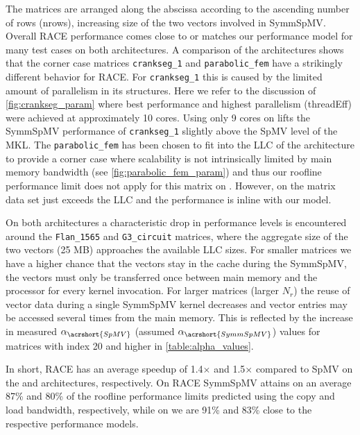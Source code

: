 The matrices are arranged along the abscissa according to the ascending number of rows (\acrshort{nrows}), \ie increasing size of the two vectors involved in \acrshort{SymmSpMV}. Overall \acrshort{RACE}  performance comes close to or matches our performance model for many test cases on both architectures. 
A comparison of the architectures shows that the corner case matrices \texttt{crankseg\_1} and \texttt{parabolic\_fem} have a strikingly different behavior for \acrshort{RACE}. For \texttt{crankseg\_1} this is caused by the limited amount of parallelism in its structures. Here we refer to the discussion of \cref{fig:crankseg_param} where best performance and highest parallelism (\acrshort{threadEff}) were achieved at approximately 10 cores. Using only 9 cores on \SKX lifts the \acrshort{SymmSpMV} performance of  \texttt{crankseg\_1} slightly above the \acrshort{SpMV} level of the MKL. The \texttt{parabolic\_fem} has been chosen to fit into the \acrshort{LLC} of the \SKX architecture to provide a corner case where scalability is not intrinsically limited by main memory bandwidth (see  \cref{fig:parabolic_fem_param}) and thus our roofline performance limit does not apply for this matrix on \SKX. However, on \IVB the matrix data set just exceeds the LLC and the performance is inline with our model. 

On both architectures a characteristic drop in performance levels is encountered around the \texttt{Flan\_1565} and \texttt{G3\_circuit} matrices, where the aggregate size of the two vectors (25 MB) approaches the available LLC sizes. For smaller matrices we have a higher chance that the vectors stay in the cache during the \acrshort{SymmSpMV}, \ie the vectors must only be transferred once between main memory and the processor for every kernel invocation. 
For larger matrices (\ie larger $N_r$) the reuse of vector data during a single \acrshort{SymmSpMV} kernel decreases and vector entries may be accessed several times from the main memory. This is reflected by the increase in measured $\alpha_{\acrshort{SpMV}}$ (assumed $\alpha_{\acrshort{SymmSpMV}}$) values for matrices with index 20 and higher in \cref{table:alpha_values}. 

In short, \acrshort{RACE} has an average speedup of 1.4$\times$ and 1.5$\times$ compared to \acrshort{SpMV} on the \SKX and \IVB architectures, respectively. On \SKX \acrshort{RACE} \acrshort{SymmSpMV} attains on an average 87\% and 80\% of the roofline performance limits predicted using the copy and load bandwidth, respectively, while on \IVB we are 91\% and 83\% close to the respective performance models.

